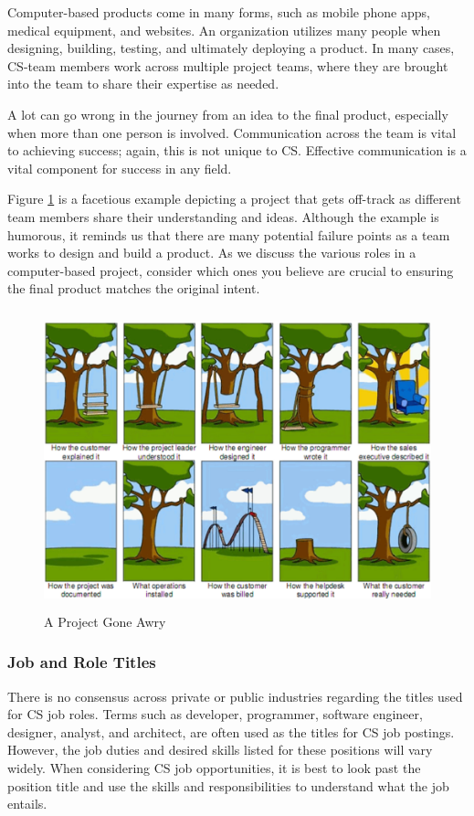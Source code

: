 Computer-based products come in many forms, such as mobile phone apps, medical equipment, and websites. An organization utilizes many people when designing, building, testing, and ultimately deploying a product. In many cases, CS-team members work across multiple project teams, where they are brought into the team to share their expertise as needed. 

A lot can go wrong in the journey from an idea to the final product, especially when more than one person is involved. Communication across the team is vital to achieving success; again, this is not unique to CS. Effective communication is a vital component for success in any field.

Figure \ref{fig:figure1} is a facetious example depicting a project that gets off-track as different team members share their understanding and ideas. Although the example is humorous, it reminds us that there are many potential failure points as a team works to design and build a product. As we discuss the various roles in a computer-based project, consider which ones you believe are crucial to ensuring the final product matches the original intent.

\begin{figure}[H]
	\begin{center}
		\caption{A Project Gone Awry}
		\label{fig:figure1}
		\vskip 4pt
		\includegraphics[height=3.4in]{figs2/tree-swing-requirements-issue.png}
	\end{center}
\end{figure}

\vspace{10pt}

\subsubsection{Job and Role Titles}
There is no consensus across private or public industries regarding the titles used for CS job roles. Terms such as developer, programmer, software engineer, designer, analyst, and architect, are often used as the titles for CS job postings. However, the job duties and desired skills listed for these positions will vary widely. When considering CS job opportunities, it is best to look past the position title and use the skills and responsibilities to understand what the job entails.

